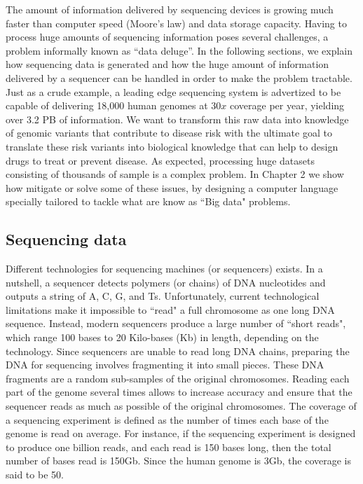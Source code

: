 The amount of information delivered by sequencing devices is growing much faster than computer speed (Moore's law) and data storage capacity. Having to process huge amounts of sequencing information poses several challenges, a problem informally known as ``data deluge''. In the following sections, we explain how sequencing data is generated and how the huge amount of information delivered by a sequencer can be handled in order to make the problem tractable. Just as a crude example, a leading edge sequencing system is advertized to be capable of delivering 18,000 human genomes at $30x$ coverage per year, yielding over 3.2 PB of information. We want to transform this raw data into knowledge of genomic variants that contribute to disease risk with the ultimate goal to translate these risk variants into biological knowledge that can help to design drugs to treat or prevent disease. As expected, processing huge datasets consisting of thousands of sample is a complex problem. In Chapter 2 we show how mitigate or solve some of these issues, by designing a computer language specially tailored to tackle what are know as ``Big data" problems.

\subsection{Sequencing data}

Different technologies for sequencing machines (or sequencers) exists. In a nutshell, a sequencer detects polymers (or chains) of DNA nucleotides and outputs a string of A, C, G, and Ts. Unfortunately, current technological limitations make it impossible to ``read" a full chromosome as one long DNA sequence. Instead, modern sequencers produce a large number of ``short reads", which range 100 bases to 20 Kilo-bases (Kb) in length, depending on the technology. Since sequencers are unable to read long DNA chains, preparing the DNA for sequencing involves fragmenting it into small pieces. These DNA fragments are a random sub-samples of the original chromosomes. Reading each part of the genome several times allows to increase accuracy and ensure that the sequencer reads as much as possible of the original chromosomes. The coverage of a sequencing experiment is defined as the number of times each base of the genome is read on average. For instance, if the sequencing experiment is designed to produce one billion reads, and each read is 150 bases long, then the total number of bases read is 150Gb. Since the human genome is 3Gb, the coverage is said to be 50.

